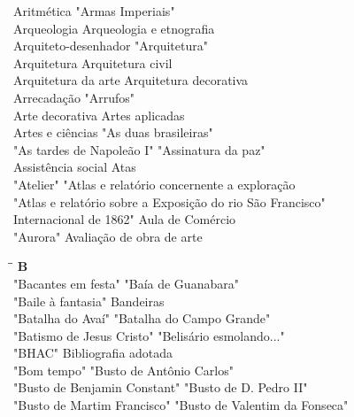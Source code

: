 \begin{tabbing}
	Aritmética  \> "Armas Imperiais"\\
	Arqueologia \> Arqueologia e etnografia \\ 
	Arquiteto-desenhador	\> "Arquitetura" \\ 
	Arquitetura \> Arquitetura civil\\
	Arquitetura da arte  \> Arquitetura decorativa\\
	Arrecadação  \> "Arrufos"\\
	Arte decorativa  \> Artes aplicadas\\
	Artes e ciências \> "As duas brasileiras" \\ 
	"As tardes de Napoleão I"	\> "Assinatura da paz" \\ 
	Assistência social \> Atas\\
	"Atelier"  \> "Atlas e relatório concernente a exploração\\
	"Atlas e relatório sobre a Exposição  \> do rio São Francisco"\\
	Internacional de 1862"  \> Aula de Comércio\\
	"Aurora"  \> Avaliação de obra de arte\\		   	   
\end{tabbing}

\begin{tabbing}
	\hspace{8,7cm}\=\hspace{1cm}\=\kill
	\textbf{B} \>  \\ 
	"Bacantes em festa"	\> "Baía de Guanabara"\\
	"Baile à fantasia" \> Bandeiras\\
	"Batalha do Avaí" \> "Batalha do Campo Grande"\\
	"Batismo de Jesus Cristo" \> "Belisário esmolando..."\\ 
	"BHAC" \>  Bibliografia adotada\\ 
	"Bom tempo" \> "Busto de Antônio Carlos"\\ 
	"Busto de Benjamin Constant" \> "Busto de D. Pedro II"\\
	"Busto de Martim Francisco" \> "Busto de Valentim da Fonseca" \\		   	   
\end{tabbing}

